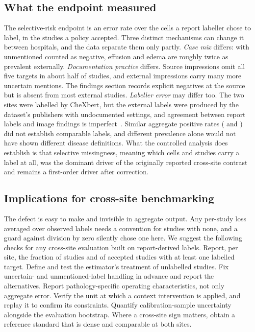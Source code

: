 \subsection{What the endpoint measured}
The selective-risk endpoint is an error rate over the cells a report labeller
chose to label, in the studies a policy accepted. Three distinct mechanisms can
change it between hospitals, and the data separate them only partly.
\emph{Case mix} differs: with unmentioned counted as negative, effusion and
edema are roughly twice as prevalent externally. \emph{Documentation practice}
differs. Source impressions omit all five targets in about half of studies, and
external impressions carry many more uncertain mentions. The findings section
records explicit negatives at the source but is absent from most external
studies. \emph{Labeller error} may differ too. The two sites were labelled by
CheXbert, but the external labels were produced by the dataset's publishers
with undocumented settings, and agreement between report labels and image
findings is imperfect~\cite{jain2021visualchexbert,rafferty2025limitations}.
Similar aggregate positive rates (\PosSrcImpression{} and \PosExtImpression{})
did not establish comparable labels, and different prevalence alone would not
have shown different disease definitions. What the controlled analysis does
establish is that selective missingness, meaning which cells and studies carry
a label at all, was the dominant driver of the originally reported cross-site contrast
and remains a first-order driver after correction.

\subsection{Implications for cross-site benchmarking}
The defect is easy to make and invisible in aggregate output. Any per-study
loss averaged over observed labels needs a convention for studies with none,
and a guard against division by zero silently chose one here. We suggest
the following checks for any cross-site evaluation built on report-derived
labels. Report, per site, the fraction of studies and of accepted studies
with at least one labelled target. Define and test the estimator's treatment
of unlabelled studies. Fix uncertain- and unmentioned-label handling in
advance and report the alternatives. Report pathology-specific operating
characteristics, not only aggregate error. Verify the unit at which a context
intervention is applied, and replay it to confirm its constraints. Quantify
calibration-sample uncertainty alongside the evaluation bootstrap. Where a
cross-site sign matters, obtain a reference standard that is dense and
comparable at both sites.

